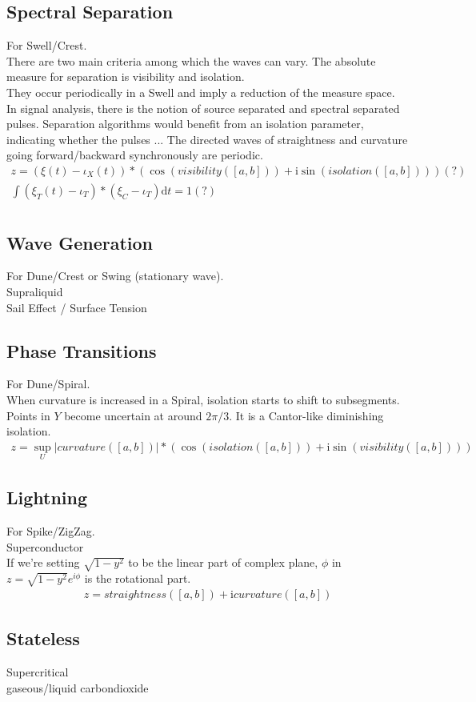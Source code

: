\documentclass{report}
\begin{document}
\subsection{Spectral Separation}
For Swell/Crest.\\
There are two main criteria among which the waves can vary. The absolute measure for separation is visibility and isolation.\\
They occur periodically in a Swell and imply a reduction of the measure space.\\
In signal analysis, there is the notion of source separated and spectral separated pulses. Separation algorithms would benefit from an isolation parameter, indicating whether the pulses ...
The directed waves of straightness and curvature going forward/backward synchronously are periodic.
\begin{align}
z =  (\xi(t)-\iota_{X}(t))*(\cos{(visibility([a,b]))} +\mathrm{i} \sin{(isolation([a,b]))})(?)\\
\int \limits _{}^{} (\xi_{T}(t)-\iota_{T})*(\xi_{C}-\iota_{T})\mathrm{d}t=1(?)
\end{align}

\subsection{Wave Generation}
For Dune/Crest or Swing (stationary wave).\\
Supraliquid\\
Sail Effect / Surface Tension

\subsection{Phase Transitions}
For Dune/Spiral.\\
When curvature is increased in a Spiral, isolation starts to shift to subsegments. Points in $Y$ become uncertain at around $2\pi/3$. It is a Cantor-like diminishing isolation.
\begin{align}
z =  \sup_{U}\lvert curvature([a,b]) \rvert*(\cos{(isolation([a,b]))} +\mathrm{i} \sin{(visibility([a,b]))})
\end{align}

\subsection{Lightning}
For Spike/ZigZag.\\
Superconductor\\
If we're setting $\sqrt{1-y^2}$ to be the linear part of complex plane, $\phi$ in $z=\sqrt{1-y^2}e^{i\phi}$ is the rotational part.
\begin{align}
z =  straightness([a,b]) + \mathrm{i} curvature([a,b])
\end{align}

\subsection{Stateless}
Supercritical\\
gaseous/liquid carbondioxide

\printbibliography
\end{document}
